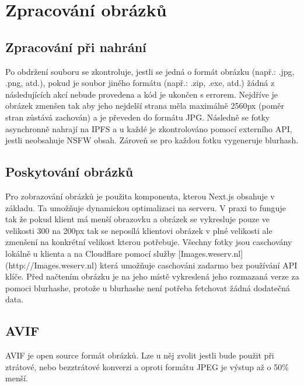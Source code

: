\chapter{Zpracování obrázků}
\section{Zpracování při nahrání}
Po obdržení souboru se zkontroluje, jestli se jedná o formát obrázku (např.: .jpg, .png, atd.), pokud je soubor jiného formátu (např.: .zip, .exe, atd.) žádná z následujících akcí nebude provedena a kód je ukončen s errorem. Nejdříve je obrázek zmenšen tak aby jeho nejdelší strana měla maximálně 2560px (poměr stran zůstává zachován) a je převeden do formátu JPG. Následně se fotky asynchronně nahrají na IPFS a u každé je zkontrolováno pomocí externího API, jestli neobsahuje NSFW obsah. Zároveň se pro každou fotku vygeneruje blurhash.

\section{Poskytování obrázků}
Pro zobrazování obrázků je použita komponenta, kterou Next.js obsahuje v základu. Ta umožňuje dynamickou optimalizaci na serveru. V praxi to funguje tak že pokud klient má menší obrazovku a obrázek se vykresluje pouze ve velikosti 300 na 200px tak se neposílá klientovi obrázek v plné velikosti ale zmenšení na konkrétní velikost kterou potřebuje. Všechny fotky jsou caschovány lokálně u klienta a  na Cloudflare pomocí služby [Images.weserv.nl](http://Images.weserv.nl) která umožňuje caschováni zadarmo bez používání API klíče. Před načtením obrázku je na jeho místě vykreslená jeho rozmazaná verze za pomoci blurhashe, protože u blurhashe není potřeba fetchovat žádná dodatečná data.

\section{AVIF}
AVIF je open source formát obrázků. Lze u něj zvolit jestli bude použit při ztrátové, nebo bezztrátové konverzi a oproti formátu JPEG je výstup až o 50\% menší.